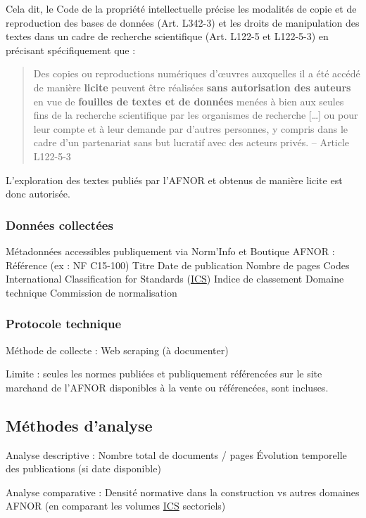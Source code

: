 \documentclass[a4paper,12pt]{article}
\begin{document}
Cela dit, le Code de la propriété intellectuelle précise les modalités de copie et de reproduction des bases de données (Art. L342-3) et les droits de manipulation des textes dans un cadre de recherche scientifique (Art. L122-5 et L122-5-3)\autocite{CodeProprieteIntellectuelle} en précisant spécifiquement que :
\begin{quote}
Des copies ou reproductions numériques d'œuvres auxquelles il a été accédé de manière \textbf{licite} peuvent être réalisées \textbf{sans autorisation des auteurs} en vue de \textbf{fouilles de textes et de données} menées à bien aux seules fins de la recherche scientifique par les organismes de recherche [\ldots{}] ou pour leur compte et à leur demande par d'autres personnes, y compris dans le cadre d'un partenariat sans but lucratif avec des acteurs privés. -- Article L122-5-3\autocite{CodeProprieteIntellectuelle}
\end{quote}

L'exploration des textes publiés par l'AFNOR et obtenus de manière licite est donc autorisée.
\subsubsection{Données collectées}
\label{sec:org93facc4}
Métadonnées accessibles publiquement via Norm’Info et Boutique AFNOR :
    Référence (ex : NF C15-100)
    Titre
    Date de publication
    Nombre de pages
    Codes International Classification for Standards
 (\protect\hyperlink{gls-5}{\label{gls-5-use-1}ICS})
    Indice de classement
    Domaine technique
    Commission de normalisation
\subsubsection{Protocole technique}
\label{sec:orgd68abac}
Méthode de collecte : Web scraping (à documenter)

Limite : seules les normes publiées et publiquement référencées sur le site marchand de l'AFNOR disponibles à la vente ou référencées, sont incluses.
\subsection{Méthodes d'analyse}
\label{sec:orgcb2235f}
Analyse descriptive :
    Nombre total de documents / pages
    Évolution temporelle des publications (si date disponible)

Analyse comparative :
    Densité normative dans la construction vs autres domaines AFNOR (en comparant les volumes \protect\hyperlink{gls-5}{\label{gls-5-use-2}ICS} sectoriels)
\end{document}
